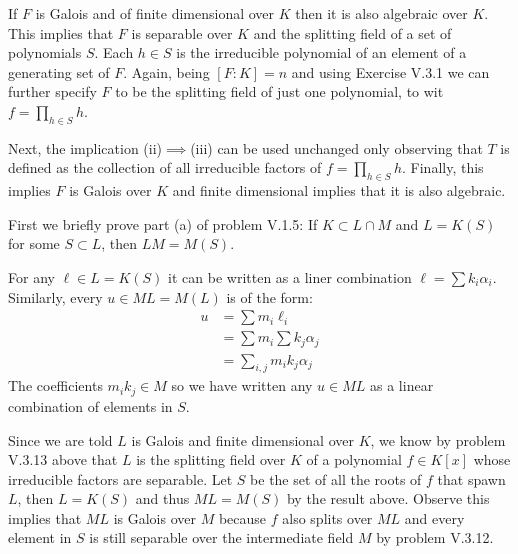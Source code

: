 If $F$ is Galois and of finite dimensional over $K$ then it is also algebraic over $K$. 
This implies that $F$ is separable over $K$ and  the splitting field of a  set of polynomials $S$. 
Each $h\in S$ is the irreducible polynomial of an element of a generating set of $F$. 
Again, being $[F:K]=n$ and using Exercise V.3.1 we can further specify $F$ to be the splitting field of just one polynomial, to wit $f=\prod_{h\in S}h$.

Next, the implication (ii)$\implies$(iii) can be used unchanged only observing that $T$ is defined as the collection of all irreducible factors of $f=\prod_{h\in S}h$. 
Finally, this implies $F$ is Galois over $K$ and finite dimensional implies that it is also algebraic.

First we briefly prove part (a) of problem V.1.5: If $K\subset L\cap M$ and $L=K(S)$ for some $S\subset L$, then $LM = M(S)$.

For any $\ell \in L=K(S)$ it can be written as a liner combination $\ell=\sum k_i\alpha_i$. Similarly, every $u\in ML=M(L)$ is of the form:
\begin{align*}
u &= \sum m_i \ell_i\\
  &= \sum m_i \sum k_j \alpha_j\\
  &= \sum_{i,j} m_i k_j \alpha_j
\end{align*}
The coefficients $m_ik_j\in M$ so we have written any $u\in ML$ as a linear combination of elements in $S$.

Since we are told $L$ is Galois and finite dimensional over $K$, we know by problem V.3.13 above that $L$ is the splitting field over $K$ of a polynomial $f\in K[x]$ whose irreducible factors are separable.
Let $S$ be the set of all the roots of $f$ that spawn $L$, then $L= K(S)$ and thus $ML=M(S)$ by the result above.
Observe this implies that $ML$ is Galois over $M$ because $f$ also splits over $ML$ and every element in $S$ is still separable over the intermediate field $M$ by problem V.3.12.

